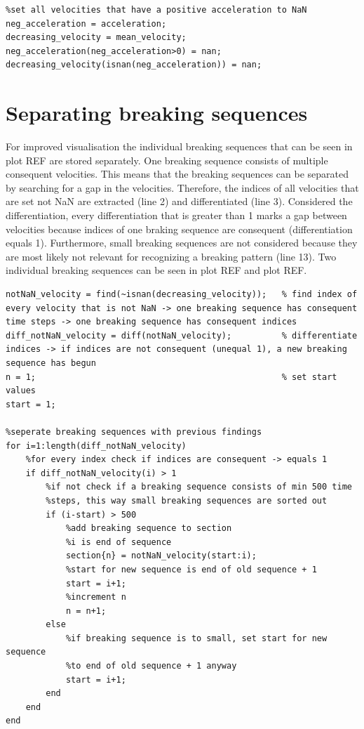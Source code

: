 \begin{lstlisting}[basicstyle=\scriptsize	,caption= Extracting negative acceleration,label= lst:D3Extract]
%search for negative acceleration and set positive acceleration to NaN
%set all velocities that have a positive acceleration to NaN
neg_acceleration = acceleration;
decreasing_velocity = mean_velocity;
neg_acceleration(neg_acceleration>0) = nan;
decreasing_velocity(isnan(neg_acceleration)) = nan;
\end{lstlisting}

\section{Separating breaking sequences}
For improved visualisation the individual breaking sequences that can be seen in plot REF are stored separately. One breaking sequence consists of multiple consequent velocities. This means that the breaking sequences can be separated by searching for a gap in the velocities. Therefore, the indices of all velocities that are set not \ac{NaN} are extracted (line 2) and differentiated (line 3). Considered the differentiation, every differentiation that is greater than 1 marks a gap between velocities because indices of one braking sequence are consequent (differentiation equals 1). Furthermore, small breaking sequences are not considered because they are most likely not relevant for recognizing a breaking pattern (line 13). Two individual breaking sequences can be seen in plot REF and plot REF.

\begin{lstlisting}[basicstyle=\scriptsize	,caption= Separating breaking sequences,label= lst:D3Seperat]
%find individual breaking sequences
notNaN_velocity = find(~isnan(decreasing_velocity));   % find index of every velocity that is not NaN -> one breaking sequence has consequent time steps -> one breaking sequence has consequent indices
diff_notNaN_velocity = diff(notNaN_velocity);          % differentiate indices -> if indices are not consequent (unequal 1), a new breaking sequence has begun
n = 1;                                                 % set start values
start = 1;

%seperate breaking sequences with previous findings
for i=1:length(diff_notNaN_velocity)
    %for every index check if indices are consequent -> equals 1
    if diff_notNaN_velocity(i) > 1
        %if not check if a breaking sequence consists of min 500 time
        %steps, this way small breaking sequences are sorted out
        if (i-start) > 500
            %add breaking sequence to section
            %i is end of sequence
            section{n} = notNaN_velocity(start:i);
            %start for new sequence is end of old sequence + 1
            start = i+1;
            %increment n
            n = n+1;
        else
            %if breaking sequence is to small, set start for new sequence
            %to end of old sequence + 1 anyway
            start = i+1;
        end
    end
end
\end{lstlisting}

